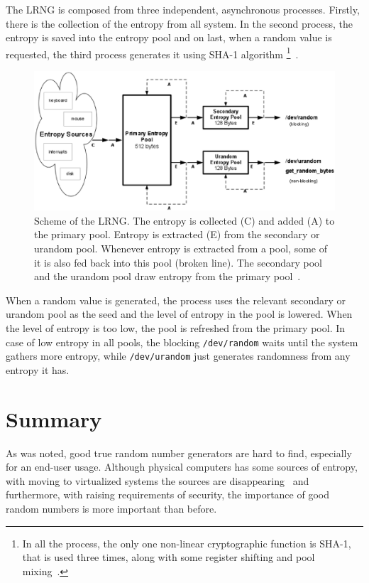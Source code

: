 \par{
The LRNG is composed from three independent, asynchronous processes. 
Firstly, there is the collection of the entropy from all system. In the second 
process, the entropy is saved into the entropy pool and on last, when a random 
value is requested, the third process generates it using SHA-1 algorithm
\footnote{In all the process, the only one non-linear cryptographic function 
is SHA-1, that is used three times, along with some register shifting and pool 
mixing~\cite[section~2.6]{AnalysisOfLinuxRNG}.}~\cite[chapter~2]{AnalysisOfLinuxRNG}.
}

\begin{figure}[h!]
  \centering
 \includegraphics[width=16cm,keepaspectratio]{fig/LRNG} %
\caption{Scheme of the LRNG. The entropy is collected (C) and added (A) 
to the primary pool. Entropy is extracted (E) from the secondary or urandom 
pool. Whenever entropy is extracted from a pool, some of it is also fed back 
into this pool (broken line). The secondary pool and the urandom pool draw 
entropy from the primary pool~\cite{AnalysisOfLinuxRNG}.}
\label{fig:LRNG}
\end{figure}

\par{
When a random value is generated, the process uses the relevant secondary 
or urandom pool as the seed and the level of entropy in the pool is lowered. 
When the level of entropy is too low, the pool is refreshed from the primary pool. 
In case of low entropy in all pools, the blocking {\tt /dev/random} waits until the 
system gathers more entropy, while {\tt /dev/urandom} just generates 
randomness from any entropy it has.
}


\section{Summary}
\par{
As was noted, good true random number generators are hard to find, especially 
for an end-user usage. Although physical computers has some sources 
of entropy, with moving to virtualized systems the sources are 
disappearing~\cite{AnalysisOfEntropyLevels} and furthermore, with raising 
requirements of security, the importance of good random numbers is more 
important than before.
}

